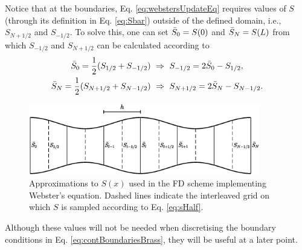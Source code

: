 Notice that at the boundaries, Eq. \eqref{eq:webstersUpdateEq} requires values of $S$ (through its definition in Eq. \eqref{eq:Sbar}) outside of the defined domain, i.e., $S_{N+1/2}$ and $S_{-1/2}$. To solve this, one can set $\bar{S}_0 = S(0)$ and $\bar{S}_N = S(L)$ from which $S_{-1/2}$ and $S_{N+1/2}$ can be calculated according to
\begin{subequations}
    \begin{align}
        \Sbar_0 = \frac{1}{2}(S_{1/2} + S_{-1/2}) \ &\Rightarrow \ S_{-1/2} = 2\Sbar_0 - S_{1/2},\\
        \Sbar_N = \frac{1}{2}(S_{N+1/2} + S_{N-1/2}) \ &\Rightarrow \ S_{N+1/2} = 2\Sbar_N - S_{N-1/2}.\label{eq:Snph}
    \end{align} 
\end{subequations}
\begin{figure}[t]
    \centering
    \includegraphics[width=0.9\textwidth]{figures/resonators/brass/variableCrossSection.eps}
    \caption{Approximations to $S(x)$ used in the FD scheme implementing Webster's equation. Dashed lines indicate the interleaved grid on which $S$ is sampled according to Eq. \eqref{eq:sHalf}. \label{fig:variableCrossSection}}
\end{figure}
Although these values will not be needed when discretising the boundary conditions in Eq. \eqref{eq:contBoundariesBrass}, they will be useful at a later point.

